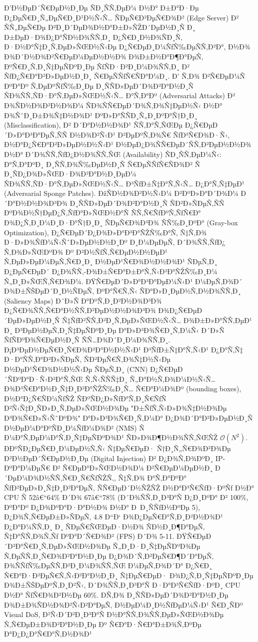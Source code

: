 \documentclass[]{article}
\begin{document}
Ð’Ð½ÐµÐ´Ñ€ÐµÐ½Ð¸Ðµ ÑÐ¸ÑÑ‚ÐµÐ¼ Ð½Ð° Ð±Ð°Ð·Ðµ Ð¿ÐµÑ€Ð¸Ñ„ÐµÑ€Ð¸Ð¹Ð½Ñ‹Ñ… ÑÐµÑ€Ð²ÐµÑ€Ð¾Ð² (Edge Server) Ð² ÑÑ„ÐµÑ€Ðµ Ð²Ð¸Ð´ÐµÐ¾Ð½Ð°Ð±Ð»ÑŽÐ´ÐµÐ½Ð¸Ñ Ð¸ Ð±ÐµÐ·Ð¾Ð¿Ð°ÑÐ½Ð¾ÑÑ‚Ð¸ Ð¿Ñ€Ð¸Ð½Ð¾ÑÐ¸Ñ‚ Ð·Ð½Ð°Ñ‡Ð¸Ñ‚ÐµÐ»ÑŒÐ½Ñ‹Ðµ Ð¿Ñ€ÐµÐ¸Ð¼ÑƒÑ‰ÐµÑÑ‚Ð²Ð°, Ð½Ð¾ Ð¾Ð´Ð½Ð¾Ð²Ñ€ÐµÐ¼ÐµÐ½Ð½Ð¾ Ð¾Ð±Ð½Ð°Ð¶Ð°ÐµÑ‚ ÐºÑ€Ð¸Ñ‚Ð¸Ñ‡ÐµÑÐºÐ¸Ðµ ÑƒÑÐ·Ð²Ð¸Ð¼Ð¾ÑÑ‚Ð¸ Ð² ÑƒÐ¿Ñ€Ð°Ð²Ð»ÐµÐ½Ð¸Ð¸ Ñ€ÐµÑÑƒÑ€ÑÐ°Ð¼Ð¸. Ð’ Ñ‚Ð¾ Ð²Ñ€ÐµÐ¼Ñ ÐºÐ°Ðº Ñ‚ÐµÐºÑƒÑ‰Ð¸Ðµ Ð¸ÑÑÐ»ÐµÐ´Ð¾Ð²Ð°Ð½Ð¸Ñ ÑÐ¾ÑÑ‚ÑÐ·Ð°Ñ‚ÐµÐ»ÑŒÐ½Ñ‹Ñ… Ð°Ñ‚Ð°Ðº (Adversarial Attacks) Ð² Ð¾ÑÐ½Ð¾Ð²Ð½Ð¾Ð¼ ÑÐ¾ÑÑ€ÐµÐ´Ð¾Ñ‚Ð¾Ñ‡ÐµÐ½Ñ‹ Ð½Ð° Ð¾ÑˆÐ¸Ð±Ð¾Ñ‡Ð½Ð¾Ð¹ ÐºÐ»Ð°ÑÑÐ¸Ñ„Ð¸ÐºÐ°Ñ†Ð¸Ð¸ (Misclassification), Ð² Ð´Ð°Ð½Ð½Ð¾Ð¹ ÑÑ‚Ð°Ñ‚ÑŒÐµ Ð¿Ñ€ÐµÐ´Ð»Ð°Ð³Ð°ÐµÑ‚ÑÑ Ð½Ð¾Ð²Ñ‹Ð¹ Ð²ÐµÐºÑ‚Ð¾Ñ€ ÑƒÐ³Ñ€Ð¾Ð·Ñ‹, Ð½Ð°Ð¿Ñ€Ð°Ð²Ð»ÐµÐ½Ð½Ñ‹Ð¹ Ð½ÐµÐ¿Ð¾ÑÑ€ÐµÐ´ÑÑ‚Ð²ÐµÐ½Ð½Ð¾ Ð½Ð° Ð´Ð¾ÑÑ‚ÑƒÐ¿Ð½Ð¾ÑÑ‚ÑŒ (Availability) ÑÐ¸ÑÑ‚ÐµÐ¼Ñ‹: Ð°Ñ‚Ð°ÐºÐ¸ Ð¸ÑÑ‚Ð¾Ñ‰ÐµÐ½Ð¸Ñ Ñ€ÐµÑÑƒÑ€ÑÐ¾Ð² Ñ Ð¸ÑÐ¿Ð¾Ð»ÑŒÐ·Ð¾Ð²Ð°Ð½Ð¸ÐµÐ¼ ÑÐ¾ÑÑ‚ÑÐ·Ð°Ñ‚ÐµÐ»ÑŒÐ½Ñ‹Ñ… Ð³ÑƒÐ±Ñ‡Ð°Ñ‚Ñ‹Ñ… Ð¿Ð°Ñ‚Ñ‡ÐµÐ¹ (Adversarial Sponge Patches). ÐžÑÐ½Ð¾Ð²Ð½Ñ‹Ð¼ Ð²ÐºÐ»Ð°Ð´Ð¾Ð¼ Ð´Ð°Ð½Ð½Ð¾Ð³Ð¾ Ð¸ÑÑÐ»ÐµÐ´Ð¾Ð²Ð°Ð½Ð¸Ñ ÑÐ²Ð»ÑÐµÑ‚ÑÑ ÐºÐ¾Ð½Ñ†ÐµÐ¿Ñ‚ÑƒÐ°Ð»ÑŒÐ½Ð°Ñ ÑÑ‚Ñ€ÑƒÐºÑ‚ÑƒÑ€Ð° Ð¾Ð¿Ñ‚Ð¸Ð¼Ð¸Ð·Ð°Ñ†Ð¸Ð¸ ÑÐµÑ€Ð¾Ð³Ð¾ ÑÑ‰Ð¸ÐºÐ° (Gray-box Optimization), Ð¿Ñ€ÐµÐ´Ð¿Ð¾Ð»Ð°Ð³Ð°ÑŽÑ‰Ð°Ñ, Ñ‡Ñ‚Ð¾ Ð·Ð»Ð¾ÑƒÐ¼Ñ‹ÑˆÐ»ÐµÐ½Ð½Ð¸Ðº Ð¸Ð¼ÐµÐµÑ‚ Ð´Ð¾ÑÑ‚ÑƒÐ¿ Ñ‚Ð¾Ð»ÑŒÐºÐ¾ Ðº Ð²Ð½ÑƒÑ‚Ñ€ÐµÐ½Ð½ÐµÐ¹ Ñ‚ÐµÐ»ÐµÐ¼ÐµÑ‚Ñ€Ð¸Ð¸ Ð½ÐµÐ¹Ñ€Ð¾Ð½Ð½Ð¾Ð¹ ÑÐµÑ‚Ð¸ Ð¿ÐµÑ€ÐµÐ´ Ð¿Ð¾ÑÑ‚-Ð¾Ð±Ñ€Ð°Ð±Ð°Ñ‚Ñ‹Ð²Ð°ÑŽÑ‰Ð¸Ð¼ Ñ„Ð¸Ð»ÑŒÑ‚Ñ€Ð¾Ð¼. ÐŸÑ€ÐµÐ´Ð»Ð°Ð³Ð°ÐµÐ¼Ñ‹Ð¹ Ð¼ÐµÑ‚Ð¾Ð´ Ð¾Ð±ÑŠÐµÐ´Ð¸Ð½ÑÐµÑ‚ ÐºÐ°Ñ€Ñ‚Ñ‹ ÑÐ°Ð»Ð¸ÐµÐ½Ñ‚Ð½Ð¾ÑÑ‚Ð¸ (Saliency Maps) Ð´Ð»Ñ Ð°ÐºÑ‚Ð¸Ð²Ð½Ð¾Ð³Ð¾ Ð¿Ñ€Ð¾ÑÑ‚Ñ€Ð°Ð½ÑÑ‚Ð²ÐµÐ½Ð½Ð¾Ð³Ð¾ Ð¾Ð¿Ñ€ÐµÐ´ÐµÐ»ÐµÐ½Ð¸Ñ Ñ‡ÑƒÐ²ÑÑ‚Ð²Ð¸Ñ‚ÐµÐ»ÑŒÐ½Ñ‹Ñ… Ð¾Ð±Ð»Ð°ÑÑ‚ÐµÐ¹ Ð¸ Ð³ÐµÐ½ÐµÑ‚Ð¸Ñ‡ÐµÑÐºÐ¸Ðµ Ð°Ð»Ð³Ð¾Ñ€Ð¸Ñ‚Ð¼Ñ‹ Ð´Ð»Ñ ÑƒÑÐºÐ¾Ñ€ÐµÐ½Ð¸Ñ ÑÑ…Ð¾Ð´Ð¸Ð¼Ð¾ÑÑ‚Ð¸. Ð¡Ð³ÐµÐ½ÐµÑ€Ð¸Ñ€Ð¾Ð²Ð°Ð½Ð½Ñ‹Ð¹ Ð³ÑƒÐ±Ñ‡Ð°Ñ‚Ñ‹Ð¹ Ð¿Ð°Ñ‚Ñ‡ Ð·Ð°ÑÑ‚Ð°Ð²Ð»ÑÐµÑ‚ ÑÐ²ÐµÑ€Ñ‚Ð¾Ñ‡Ð½Ñ‹Ðµ Ð½ÐµÐ¹Ñ€Ð¾Ð½Ð½Ñ‹Ðµ ÑÐµÑ‚Ð¸ (CNN) Ð¿Ñ€ÐµÐ´ÑÐºÐ°Ð·Ñ‹Ð²Ð°Ñ‚ÑŒ Ñ‚Ñ‹ÑÑÑ‡Ð¸ Ñ„Ð°Ð½Ñ‚Ð¾Ð¼Ð½Ñ‹Ñ… Ð¾Ð³Ñ€Ð°Ð½Ð¸Ñ‡Ð¸Ð²Ð°ÑŽÑ‰Ð¸Ñ… Ñ€Ð°Ð¼Ð¾Ðº (bounding boxes), Ð½Ð°Ð¿Ñ€ÑÐ¼ÑƒÑŽ ÑÐºÑÐ¿Ð»ÑƒÐ°Ñ‚Ð¸Ñ€ÑƒÑ Ð²Ñ‹Ñ‡Ð¸ÑÐ»Ð¸Ñ‚ÐµÐ»ÑŒÐ½Ð¾Ðµ "Ð±ÑƒÑ‚Ñ‹Ð»Ð¾Ñ‡Ð½Ð¾Ðµ Ð³Ð¾Ñ€Ð»Ñ‹ÑˆÐºÐ¾" Ð°Ð»Ð³Ð¾Ñ€Ð¸Ñ‚Ð¼Ð° Ð¿Ð¾Ð´Ð°Ð²Ð»ÐµÐ½Ð¸Ñ Ð½ÐµÐ¼Ð°ÐºÑÐ¸Ð¼ÑƒÐ¼Ð¾Ð² (NMS) Ñ Ð¼Ð°Ñ‚ÐµÐ¼Ð°Ñ‚Ð¸Ñ‡ÐµÑÐºÐ¾Ð¹ ÑÐ»Ð¾Ð¶Ð½Ð¾ÑÑ‚ÑŒÑŽ \(\mathcal{O}\left( N^{2} \right)\). Ð­ÐºÑÐ¿ÐµÑ€Ð¸Ð¼ÐµÐ½Ñ‚Ñ‹ Ñ‡ÐµÑ€ÐµÐ· Ñ†Ð¸Ñ„Ñ€Ð¾Ð²Ð¾Ðµ Ð²Ð½ÐµÐ´Ñ€ÐµÐ½Ð¸Ðµ (Digital Injection) Ð² Ð¿Ð¾Ñ‚Ð¾ÐºÐ¸ IP-ÐºÐ°Ð¼ÐµÑ€ Ð² Ñ€ÐµÐ°Ð»ÑŒÐ½Ð¾Ð¼ Ð²Ñ€ÐµÐ¼ÐµÐ½Ð¸ Ð´ÐµÐ¼Ð¾Ð½ÑÑ‚Ñ€Ð¸Ñ€ÑƒÑŽÑ‚, Ñ‡Ñ‚Ð¾ Ð°Ñ‚Ð°ÐºÐ° ÑƒÐ²ÐµÐ»Ð¸Ñ‡Ð¸Ð²Ð°ÐµÑ‚ ÑÑ€ÐµÐ´Ð½ÑŽÑŽ Ð½Ð°Ð³Ñ€ÑƒÐ·ÐºÑƒ Ð½Ð° CPU Ñ 52â€“64\% Ð´Ð¾ 67â€“78\% (Ð´Ð¾ÑÑ‚Ð¸Ð³Ð°Ñ Ð¿Ð¸ÐºÐ° Ð² 100\%, ÐºÐ°Ðº Ð¿Ð¾ÐºÐ°Ð·Ð°Ð½Ð¾ Ð½Ð° Ð Ð¸ÑÑƒÐ½ÐºÐµ 5), Ð¿Ð¾Ñ‚Ñ€ÐµÐ±Ð»ÑÐµÑ‚ 4.8 Ð“Ð‘ Ð¾Ð¿ÐµÑ€Ð°Ñ‚Ð¸Ð²Ð½Ð¾Ð¹ Ð¿Ð°Ð¼ÑÑ‚Ð¸ Ð¸ ÑÐµÑ€ÑŒÐµÐ·Ð½Ð¾ ÑÐ½Ð¸Ð¶Ð°ÐµÑ‚ Ñ‡Ð°ÑÑ‚Ð¾Ñ‚Ñƒ ÐºÐ°Ð´Ñ€Ð¾Ð² (FPS) Ð´Ð¾ 5-11. ÐŸÑ€ÐµÐ´Ð²Ð°Ñ€Ð¸Ñ‚ÐµÐ»ÑŒÐ½Ð¾Ðµ Ñ„Ð¸Ð·Ð¸Ñ‡ÐµÑÐºÐ¾Ðµ Ñ‚ÐµÑÑ‚Ð¸Ñ€Ð¾Ð²Ð°Ð½Ð¸Ðµ Ð¿Ð¾Ð´Ñ‚Ð²ÐµÑ€Ð¶Ð´Ð°ÐµÑ‚ Ð¾ÑÑƒÑ‰ÐµÑÑ‚Ð²Ð¸Ð¼Ð¾ÑÑ‚ÑŒ Ð¼ÐµÑ‚Ð¾Ð´Ð° Ð¿Ñ€Ð¸ Ñ€Ð°Ð·Ð²ÐµÑ€Ñ‚Ñ‹Ð²Ð°Ð½Ð¸Ð¸ Ñ‡ÐµÑ€ÐµÐ· Ð¾Ð¿Ñ‚Ð¸Ñ‡ÐµÑÐºÐ¸Ðµ Ð¾Ð±ÑŠÐµÐºÑ‚Ð¸Ð²Ñ‹, Ð´Ð¾ÑÑ‚Ð¸Ð³Ð°Ñ Ð·Ð°Ð³Ñ€ÑƒÐ·ÐºÐ¸ CPU Ð½Ð° ÑƒÑ€Ð¾Ð²Ð½Ðµ 60\%. Ð­Ñ‚Ð¾ Ð¸ÑÑÐ»ÐµÐ´Ð¾Ð²Ð°Ð½Ð¸Ðµ Ð¾Ð±Ð¾ÑÐ½Ð¾Ð²Ñ‹Ð²Ð°ÐµÑ‚ Ð½ÐµÐ¼Ð¸Ð½ÑƒÐµÐ¼Ñ‹Ð¹ Ñ€Ð¸ÑÐº Visual DoS, Ð²Ñ‹Ð´Ð²Ð¸Ð³Ð°Ñ Ð½Ð°ÑÑ‚Ð¾ÑÑ‚ÐµÐ»ÑŒÐ½Ð¾Ðµ Ñ‚Ñ€ÐµÐ±Ð¾Ð²Ð°Ð½Ð¸Ðµ Ðº Ñ€Ð°Ð·Ñ€Ð°Ð±Ð¾Ñ‚ÐºÐµ Ð°Ð¿Ð¿Ð°Ñ€Ð°Ñ‚Ð½Ð¾Ð¹ 
\end{document}
